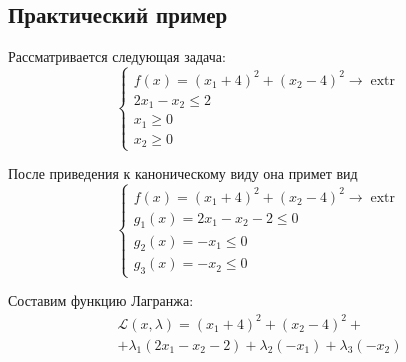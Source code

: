 \documentclass{article}
\renewcommand{\leq}{\leqslant}
\renewcommand{\geq}{\geqslant}
\providecommand{\La}{\mathcal{L}}
\DeclareMathOperator{\extr}{extr}
\numberwithin{equation}{section}
\begin{document}
\subsection{Практический пример}

Рассматривается следующая задача:
\begin{equation*}
  \begin{cases}
    f(x) = (x_1+4)^2 + (x_2-4)^2 \to \extr \\
    2x_1 - x_2 \leq 2 \\
    x_1 \geq 0 \\
    x_2 \geq 0
  \end{cases}
\end{equation*}

После приведения к каноническому виду она примет вид
\begin{equation}
  \begin{cases}
    f(x) = (x_1+4)^2 + (x_2-4)^2 \to \extr \\
    g_1(x) = 2x_1 - x_2 - 2 \leq 0 \\
    g_2(x) = -x_1 \leq 0 \\
    g_3(x) = -x_2 \leq 0
  \end{cases}
\end{equation}

Составим функцию Лагранжа:
\begin{multline}
  \label{eq:lagrange}
  \La(x, \lambda) = (x_1+4)^2 + (x_2-4)^2 +\\
  + \lambda_1(2x_1-x_2-2)+\lambda_2(-x_1)+\lambda_3(-x_2)
\end{multline}
\end{document}
